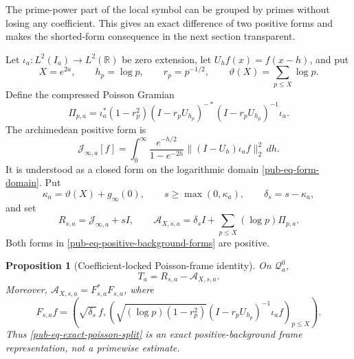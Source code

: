 \documentclass[11pt]{article}
\newtheorem{proposition}[theorem]{Proposition}
\theoremstyle{remark}
\begin{document}
The prime-power part of the local symbol can be grouped by primes without losing any coefficient.
This gives an exact difference of two positive forms and makes the shorted-form consequence in the next section transparent.

Let \(\iota_a:L^2(I_a)\to L^2(\mathbb R)\) be zero extension, let \(U_hf(x)=f(x-h)\), and put
\begin{equation}
 X=e^{2a},\qquad h_p=\log p,\qquad r_p=p^{-1/2},\qquad
 \vartheta(X)=\sum_{p\leq X}\log p.
\label{pub-eq-poisson-parameters}
\end{equation}
Define the compressed Poisson Gramian
\begin{equation}
 \Pi_{p,a}=\iota_a^*(1-r_p^2)
 (I-r_pU_{h_p})^{-*}(I-r_pU_{h_p})^{-1}\iota_a.
\label{pub-eq-poisson-gramian}
\end{equation}
The archimedean positive form is
\begin{equation}
 \mathcal J_{\infty,a}[f]=
 \int_0^\infty\frac{e^{-h/2}}{1-e^{-2h}}
 \lVert(I-U_h)\iota_af\rVert_2^2\,dh.
\label{pub-eq-archimedean-jump}
\end{equation}
It is understood as a closed form on the logarithmic domain \eqref{pub-eq-form-domain}.
Put
\begin{equation}
 \kappa_a=\vartheta(X)+g_\infty(0),\qquad
 s\geq\max(0,\kappa_a),\qquad
 \delta_s=s-\kappa_a,
\label{pub-eq-background-shift}
\end{equation}
and set
\begin{equation}
 R_{s,a}=\mathcal J_{\infty,a}+sI,
 \qquad
 \mathscr A_{X,s,a}=\delta_sI+
       \sum_{p\leq X}(\log p)\Pi_{p,a}.
\label{pub-eq-positive-background-forms}
\end{equation}
Both forms in \eqref{pub-eq-positive-background-forms} are positive.

\begin{proposition}[Coefficient-locked Poisson-frame identity]
\label{pub-prop-poisson-frame}
On \(\mathcal Q_a^0\),
\begin{equation}
                    T_a=R_{s,a}-\mathscr A_{X,s,a}.
\label{pub-eq-exact-poisson-split}
\end{equation}
Moreover, \(\mathscr A_{X,s,a}=F_{s,a}^*F_{s,a}\), where
\begin{equation}
 F_{s,a}f=\left(\sqrt{\delta_s}\,f,
 \left(\sqrt{(\log p)(1-r_p^2)}
 (I-r_pU_{h_p})^{-1}\iota_af\right)_{p\leq X}\right).
\label{pub-eq-poisson-analysis-operator}
\end{equation}
Thus \eqref{pub-eq-exact-poisson-split} is an exact positive-background frame representation, not a primewise estimate.
\end{proposition}
\end{document}
